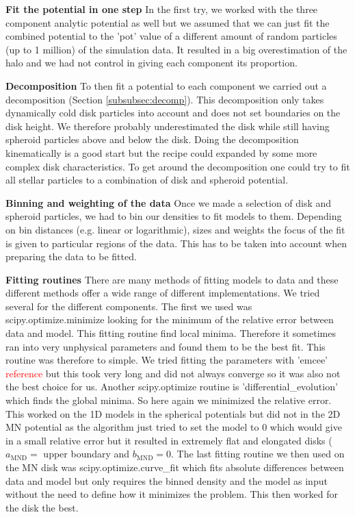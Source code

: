 \textbf{Fit the potential in one step}
In the first try, we worked with the three component analytic potential as well but we assumed that we can just fit the combined potential to the 'pot' value of a different amount of random particles (up to 1 million) of the simulation data. It resulted in a big overestimation of the halo and we had not control in giving each component its proportion.

\textbf{Decomposition}
To then fit a potential to each component we carried out a decomposition (Section \ref{subsubsec:decomp}). This decomposition only takes dynamically cold disk particles into account and does not set boundaries on the disk height. We therefore probably underestimated the disk while still having spheroid particles above and below the disk. Doing the decomposition kinematically is a good start but the recipe could expanded by some more complex disk characteristics. To get around the decomposition one could try to fit all stellar particles to a combination of disk and spheroid potential.

\textbf{Binning and weighting of the data}
Once we made a selection of disk and spheroid particles, we had to bin our densities to fit models to them. Depending on bin distances (e.g. linear or logarithmic), sizes and weights the focus of the fit is given to particular regions of the data. This has to be taken into account when preparing the data to be fitted.

\textbf{Fitting routines}
There are many methods of fitting models to data and these different methods offer a wide range of different implementations. We tried several for the different components. The first we used was scipy.optimize.minimize looking for the minimum of the relative error between data and model. This fitting routine find local minima. Therefore it sometimes ran into very unphysical parameters and found them to be the best fit. This routine was therefore to simple. We tried fitting the parameters with 'emcee' \textcolor{red}{reference} but this took very long and did not always converge so it was also not the best choice for us. Another scipy.optimize routine is 'differential\_evolution' which finds the global minima. So here again we minimized the relative error. This worked on the 1D models in the spherical potentials but did not in the 2D \ac{MN} potential as the algorithm just tried to set the model to 0 which would give in a small relative error but it resulted in extremely flat and elongated disks ($a_\mathrm{MND} = $ upper boundary and $b_\mathrm{MND} = 0$. The last fitting routine we then used on the \ac{MN} disk was scipy.optimize.curve\_fit which fits absolute differences between data and model but only requires the binned density and the model as input without the need to define how it minimizes the problem. This then worked for the disk the best. 

